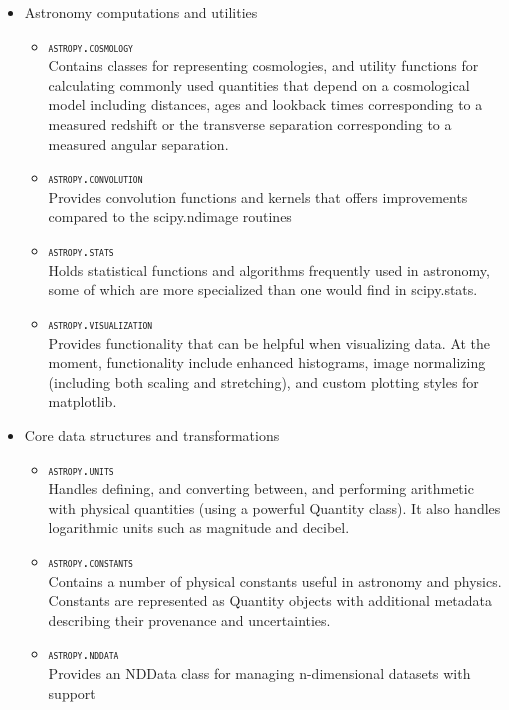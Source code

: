 \documentclass{iau}
\begin{document}
\begin{itemize}
  \item Astronomy computations and utilities
  \begin{itemize}
    \item \textsc{\texttt{astropy.cosmology}}\\
      Contains classes for representing cosmologies, and utility functions for
      calculating commonly used quantities that depend on a cosmological model
      including distances, ages and lookback times corresponding to a measured
      redshift or the transverse separation corresponding to a measured angular
      separation.
    \item \textsc{\texttt{astropy.convolution}}\\
      Provides convolution functions and kernels that offers improvements compared
      to the scipy.ndimage routines
    \item \textsc{\texttt{astropy.stats}}\\
      Holds statistical functions and algorithms frequently used in astronomy,
      some of which are more specialized than one would find in scipy.stats.
    \item \textsc{\texttt{astropy.visualization}}\\
      Provides functionality that can be helpful when visualizing data. At the
      moment, functionality include enhanced histograms, image normalizing
      (including both scaling and stretching), and custom plotting styles for
      matplotlib.
  \end{itemize}
  \item Core data structures and transformations
  \begin{itemize}
    \item \textsc{\texttt{astropy.units}}\\
      Handles defining, and converting between, and performing arithmetic with
      physical quantities (using a powerful Quantity class). It also handles
      logarithmic units such as magnitude and decibel.
    \item \textsc{\texttt{astropy.constants}}\\
      Contains a number of physical constants useful in astronomy and
      physics. Constants are represented as Quantity objects with additional
      metadata describing their provenance and uncertainties.
    \item \textsc{\texttt{astropy.nddata}}\\
      Provides an NDData class for managing n-dimensional datasets with support

\end{itemize}
\end{itemize}
\end{document}
